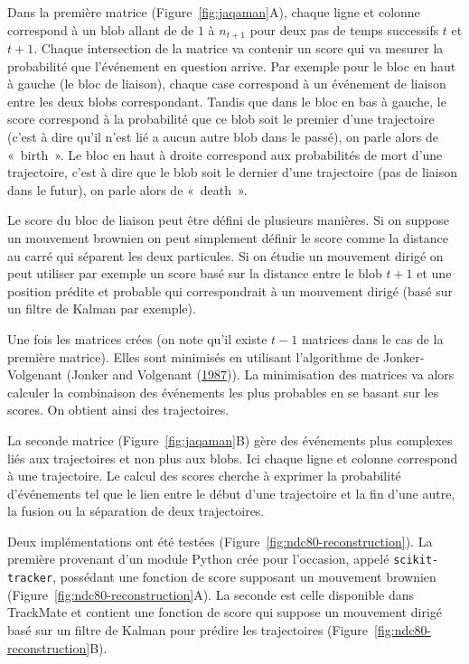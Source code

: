 \documentclass[12pt,a4paper,twoside,openright]{book}
\begin{document}
Dans la première matrice (Figure~\ref{fig:jaqaman}A), chaque ligne et
colonne correspond à un blob allant de de \(1\) à \(n_{t+1}\) pour deux
pas de temps successifs \(t\) et \(t+1\). Chaque intersection de la
matrice va contenir un score qui va mesurer la probabilité que
l'événement en question arrive. Par exemple pour le bloc en haut à
gauche (le bloc de liaison), chaque case correspond à un événement de
liaison entre les deux blobs correspondant. Tandis que dans le bloc en
bas à gauche, le score correspond à la probabilité que ce blob soit le
premier d'une trajectoire (c'est à dire qu'il n'est lié a aucun autre
blob dans le passé), on parle alors de «~birth~». Le bloc en haut à
droite correspond aux probabilités de mort d'une trajectoire, c'est à
dire que le blob soit le dernier d'une trajectoire (pas de liaison dans
le futur), on parle alors de «~death~».

Le score du bloc de liaison peut être défini de plusieurs manières. Si
on suppose un mouvement brownien on peut simplement définir le score
comme la distance au carré qui séparent les deux particules. Si on
étudie un mouvement dirigé on peut utiliser par exemple un score basé
sur la distance entre le blob \(t+1\) et une position prédite et
probable qui correspondrait à un mouvement dirigé (basé sur un filtre de
Kalman par exemple).

Une fois les matrices crées (on note qu'il existe \(t-1\) matrices dans
le cas de la première matrice). Elles sont minimisés en utilisant
l'algorithme de Jonker-Volgenant (Jonker and Volgenant
(\protect\hyperlink{ref-Jonker1987}{1987})). La minimisation des
matrices va alors calculer la combinaison des événements les plus
probables en se basant sur les scores. On obtient ainsi des
trajectoires.

La seconde matrice (Figure~\ref{fig:jaqaman}B) gère des événements plus
complexes liés aux trajectoires et non plus aux blobs. Ici chaque ligne
et colonne correspond à une trajectoire. Le calcul des scores cherche à
exprimer la probabilité d'événements tel que le lien entre le début
d'une trajectoire et la fin d'une autre, la fusion ou la séparation de
deux trajectoires.

Deux implémentations ont été testées
(Figure~\ref{fig:ndc80-reconstruction}). La première provenant d'un
module Python crée pour l'occasion, appelé \texttt{scikit-tracker},
possédant une fonction de score supposant un mouvement brownien
(Figure~\ref{fig:ndc80-reconstruction}A). La seconde est celle
disponible dans TrackMate et contient une fonction de score qui suppose
un mouvement dirigé basé sur un filtre de Kalman pour prédire les
trajectoires (Figure~\ref{fig:ndc80-reconstruction}B).
\end{document}
